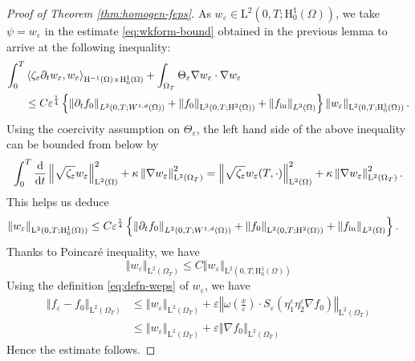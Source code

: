 \documentclass[preprint, 12pt]{amsart}
\numberwithin{equation}{section}
\numberwithin{equation}{section}
\newcommand{\eps}{\varepsilon}
\begin{document}
\begin{proof}[Proof of Theorem \ref{thm:homogen-feps}]
As $w_\eps\in \mathrm L^2(0,T;\mathrm H^1_0(\Omega))$, we take $\psi=w_\eps$ in the estimate \eqref{eq:wkform-bound} obtained in the previous lemma to arrive at the following inequality:
\begin{equation*}
\begin{aligned}
\int_0^T & \left\langle \zeta_\eps\partial_{t}w_{\varepsilon}, w_\eps \right\rangle_{\mathrm{H}^{-1}(\Omega) \times \mathrm{H}_0^1(\Omega)} 
+ \int_{\Omega_T} \Theta_\eps\nabla w_{\varepsilon} \cdot \nabla w_\eps 
\\
& \le C \eps^{\frac14} \left\{ \left\Vert \partial_tf_0\right\Vert_{L^2(0,T;W^{1,d}(\Omega))} + \left\Vert f_0\right\Vert_{\mathrm L^2(0,T;\mathrm H^2(\Omega))} + \left\Vert f_{{\rm{in}}}\right\Vert_{L^2(\Omega)} \right\}
\left\Vert w_\eps\right\Vert_{\mathrm L^2(0,T;\mathrm H^1_0(\Omega))}.
\end{aligned}
\end{equation*}
Using the coercivity assumption on $\Theta_\eps$, the left hand side of the above inequality can be bounded from below by 
\begin{equation*}
\int_0^T \frac{{\rm d}}{{\rm d}t} \left\Vert \sqrt{\zeta_\eps} w_\eps \right\Vert^2_{\mathrm L^2(\Omega)}
+ \kappa  \left\Vert \nabla w_\eps \right\Vert^2_{\mathrm L^2(\Omega_T)}
= \left\Vert \sqrt{\zeta_\eps} w_\eps(T,\cdot) \right\Vert^2_{\mathrm L^2(\Omega)}
+ \kappa  \left\Vert \nabla w_\eps \right\Vert^2_{\mathrm L^2(\Omega_T)}.
\end{equation*}
This helps us deduce
\begin{equation*}
\begin{aligned}
\left\Vert w_\eps\right\Vert_{\mathrm L^2(0,T;\mathrm H^1_0(\Omega))}
& \le C \eps^{\frac14} \left\{ \left\Vert \partial_tf_0\right\Vert_{L^2(0,T;W^{1,d}(\Omega))} + \left\Vert f_0\right\Vert_{\mathrm L^2(0,T;\mathrm H^2(\Omega))} + \left\Vert f_{{\rm{in}}}\right\Vert_{L^2(\Omega)} \right\}.
\end{aligned}
\end{equation*}
Thanks to Poincar\'e inequality, we have
\begin{equation*}
\left\Vert w_\eps\right\Vert_{\mathrm L^2(\Omega_T)}
\le C
\left\Vert w_\eps\right\Vert_{\mathrm L^2(0,T;\mathrm H^1_0(\Omega))}
\end{equation*}
Using the definition \eqref{eq:defn-weps} of $w_\eps$, we have
\begin{equation*}
\begin{aligned}
\left\Vert f_\eps - f_0 \right\Vert_{\mathrm L^2(\Omega_T)} 
& \le \left\Vert w_\eps\right\Vert_{\mathrm L^2(\Omega_T)}
+ \eps \left\Vert \omega\left(\frac{x}{\eps}\right)\cdot S_\eps \left( \eta_1^\eps \eta_2^\eps \nabla f_0 \right) \right\Vert_{\mathrm L^2(\Omega_T)}
\\
& \le \left\Vert w_\eps\right\Vert_{\mathrm L^2(\Omega_T)}
+ \eps \left\Vert \nabla f_0 \right\Vert_{\mathrm L^2(\Omega_T)}
\end{aligned}
\end{equation*}
Hence the estimate follows.
\end{proof}
\end{document}
